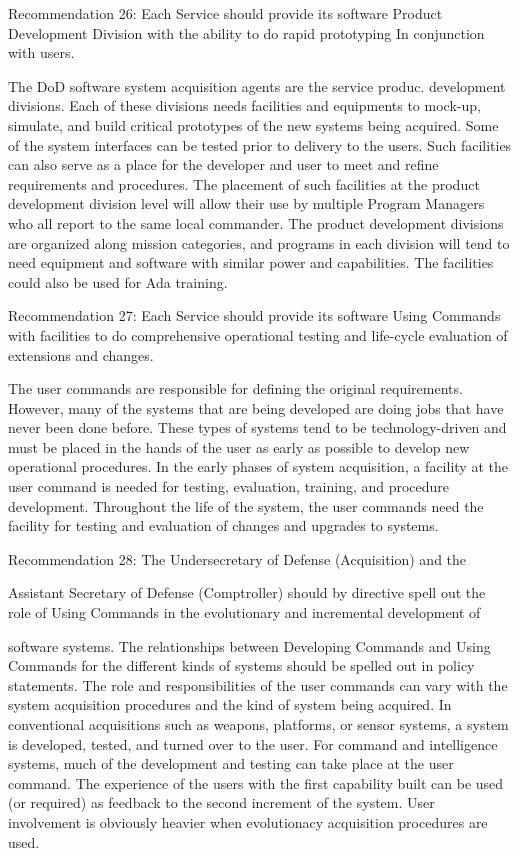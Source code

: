 \documentclass[12pt]{article}
\begin{document}

Recommendation 26: Each Service should provide its software Product
Development Division with the ability to do rapid prototyping In conjunction
with users.

The DoD software system acquisition agents are the service produc. development
divisions. Each of these divisions needs facilities and equipments to mock-up, simulate, and
build critical prototypes of the new systems being acquired. Some of the system interfaces
can be tested prior to delivery to the users. Such facilities can also serve as a place for
the developer and user to meet and refine requirements and procedures. The placement
of such facilities at the product development division level will allow their use by multiple
Program Managers who all report to the same local commander. The product development
divisions are organized along mission categories, and programs in each division will tend
to need equipment and software with similar power and capabilities. The facilities could
also be used for Ada training.

Recommendation 27: Each Service should provide its software Using Commands with facilities to do comprehensive operational testing and life-cycle
evaluation of extensions and changes.

The user commands are responsible for defining the original requirements. However,
many of the systems that are being developed are doing jobs that have never been done
before. These types of systems tend to be technology-driven and must be placed in the
hands of the user as early as possible to develop new operational procedures. In the
early phases of system acquisition, a facility at the user command is needed for testing,
evaluation, training, and procedure development. Throughout the life of the system, the
user commands need the facility for testing and evaluation of changes and upgrades to
systems.

Recommendation 28: The Undersecretary of Defense (Acquisition) and the

Assistant Secretary of Defense (Comptroller) should by directive spell out the
role of Using Commands in the evolutionary and incremental development of

software systems.
The relationships between Developing Commands and Using Commands for the
different kinds of systems should be spelled out in policy statements. The role and
responsibilities of the user commands can vary with the system acquisition procedures
and the kind of system being acquired. In conventional acquisitions such as weapons,
platforms, or sensor systems, a system is developed, tested, and turned over to the user.
For command and intelligence systems, much of the development and testing can take
place at the user command. The experience of the users with the first capability built can
be used (or required) as feedback to the second increment of the system. User involvement
is obviously heavier when evolutionacy acquisition procedures are used.
\end{document}
